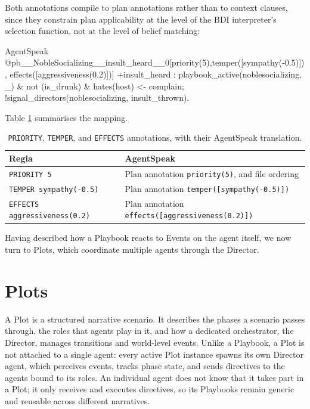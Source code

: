 Both annotations compile to plan annotations rather than to context clauses, since they constrain plan applicability at the level of the BDI interpreter's selection function, not at the level of belief matching:

\begin{codeblock}[]{AgentSpeak}
@pb__NobleSocializing__insult_heard__0[priority(5),temper([sympathy(-0.5)]), effects([aggressiveness(0.2)])]
+insult_heard : playbook_active(noblesocializing, _)
    & not (is_drunk) & hates(host) <-
    complain;
    !signal_directors(noblesocializing, insult_thrown).
\end{codeblock}

Table \ref{tab:temper-mapping} summarises the mapping.

\begin{table}[h]
\centering
\begin{tabular}{|l|l|}
\hline
\textbf{Regia} & \textbf{AgentSpeak} \\
\hline
\lstinline|PRIORITY 5| & Plan annotation \lstinline|priority(5)|, and file ordering \\
\lstinline|TEMPER sympathy(-0.5)| & Plan annotation \lstinline|temper([sympathy(-0.5)])| \\
\lstinline|EFFECTS aggressiveness(0.2)| & Plan annotation \lstinline|effects([aggressiveness(0.2)])| \\
\hline
\end{tabular}
\caption{\lstinline|PRIORITY|, \lstinline|TEMPER|, and \lstinline|EFFECTS| annotations, with their AgentSpeak translation.}
\label{tab:temper-mapping}
\end{table}

Having described how a Playbook reacts to Events on the agent itself, we now turn to Plots, which coordinate multiple agents through the Director.

\section{Plots}
\label{sec:plots}
A Plot is a structured narrative scenario. It describes the phases a scenario passes through, the roles that agents play in it, and how a dedicated orchestrator, the Director, manages transitions and world-level events. Unlike a Playbook, a Plot is not attached to a single agent: every active Plot instance spawns its own Director agent, which perceives events, tracks phase state, and sends directives to the agents bound to its roles. An individual agent does not know that it takes part in a Plot; it only receives and executes directives, so its Playbooks remain generic and reusable across different narratives.

